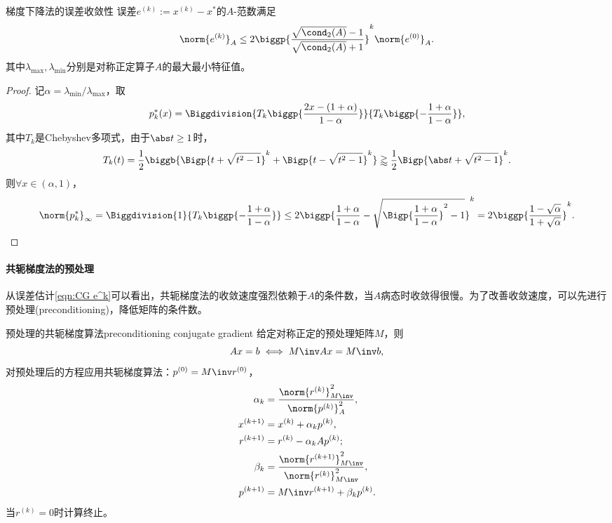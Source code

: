 \begin{theorem}
    {梯度下降法的误差收敛性}{}
    误差$e^{(k)}:=x^{(k)}-x^*$的$A$-范数满足
    \begin{equation}
        \label{eqn:CG e^k}
        \norm{e^{(k)}}_A\leq 2\biggp{\frac{\sqrt{\cond_2(A)}-1}{\sqrt{\cond_2(A)}+1}}^k\norm{e^{(0)}}_A.
    \end{equation}
    其中$\lambda_{\max},\lambda_{\min}$分别是对称正定算子$A$的最大最小特征值。
\end{theorem}

\begin{proof}
    记$\alpha=\lambda_{\min}/\lambda_{\max}$，取
    \[
        p_k^*(x)=\Biggdivision{T_k\biggp{\frac{2x-(1+\alpha)}{1-\alpha}}}{T_k\biggp{-\frac{1+\alpha}{1-\alpha}}},
    \]
    其中$T_k$是Chebyshev多项式，由于$\abs t\geq 1$时，
    \[
        T_k(t)=\frac12\biggb{\Bigp{t+\sqrt{t^2-1}}^k+\Bigp{t-\sqrt{t^2-1}}^k}\gtrapprox \frac12\Bigp{\abs t+\sqrt{t^2-1}}^k.
    \]
    则$\forall x\in(\alpha,1)$，
    \[
        \norm{p_k^*}_\infty=\Biggdivision{1}{T_k\biggp{-\frac{1+\alpha}{1-\alpha}}}\leq 2\biggp{\frac{1+\alpha}{1-\alpha}-\sqrt{\Bigp{\frac{1+\alpha}{1-\alpha}}^2-1}}^k=2\biggp{\frac{1-\sqrt\alpha}{1+\sqrt\alpha}}^k.
        \qedhere
    \]
\end{proof}

\paragraph{共轭梯度法的预处理}

从误差估计\eqref{eqn:CG e^k}可以看出，共轭梯度法的收敛速度强烈依赖于$A$的条件数，当$A$病态时收敛得很慢。为了改善收敛速度，可以先进行预处理(preconditioning)，降低矩阵的条件数。

\begin{theorem}
    {预处理的共轭梯度算法}{preconditioning conjugate gradient}
    给定对称正定的预处理矩阵$M$，则
    \[
        Ax=b\iff M\inv Ax=M\inv b,
    \]
    对预处理后的方程应用共轭梯度算法：$p^{(0)}=M\inv r^{(0)}$，
    \begin{subequations}
        \begin{align}
            \alpha_k&=\frac{\norm{r^{(k)}}_{M\inv}^2}{\norm{p^{(k)}}_A^2},\\
            x^{(k+1)}&=x^{(k)}+\alpha_kp^{(k)},\\
            r^{(k+1)}&=r^{(k)}-\alpha_kAp^{(k)};\\
            \beta_k&=\frac{\norm{r^{(k+1)}}_{M\inv}^2}{\norm{r^{(k)}}_{M\inv}^2},\\
            p^{(k+1)}&=M\inv r^{(k+1)}+\beta_kp^{(k)}.
        \end{align}
    \end{subequations}
    当$r^{(k)}=0$时计算终止。
\end{theorem}

